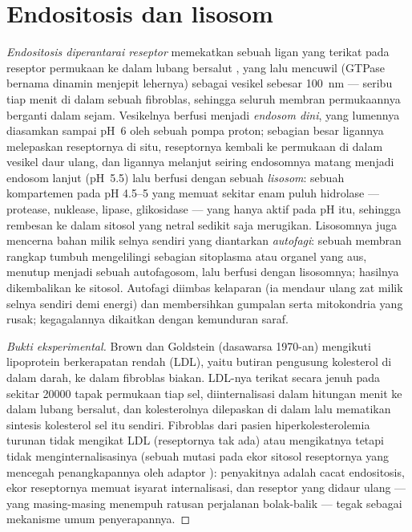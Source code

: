 \section{Endositosis dan lisosom}

\begin{definition}[Endositosis]\label{def:b3:membrane-traffic:endocytosis}
\emph{Endositosis diperantarai reseptor} memekatkan sebuah ligan yang terikat
pada reseptor permukaan ke dalam lubang bersalut , yang lalu mencuwil
(GTPase bernama dinamin menjepit lehernya) sebagai vesikel sebesar
\qty{100}{nm} --- seribu tiap menit di dalam sebuah fibroblas, sehingga
seluruh membran permukaannya berganti dalam sejam. Vesikelnya berfusi menjadi
\emph{endosom dini}, yang lumennya diasamkan sampai pH~6 oleh sebuah pompa
proton; sebagian besar ligannya melepaskan reseptornya di situ, reseptornya
kembali ke permukaan di dalam vesikel daur ulang, dan ligannya melanjut
seiring endosomnya matang menjadi endosom lanjut (pH~5.5) lalu berfusi dengan
sebuah \emph{lisosom}: sebuah kompartemen pada pH 4.5--5 yang memuat sekitar
enam puluh hidrolase --- protease, nuklease, lipase, glikosidase --- yang
hanya aktif pada pH itu, sehingga rembesan ke dalam sitosol yang netral
sedikit saja merugikan. Lisosomnya juga mencerna bahan milik selnya sendiri
yang diantarkan \emph{autofagi}: sebuah membran rangkap tumbuh mengelilingi
sebagian sitoplasma atau organel yang aus, menutup menjadi sebuah autofagosom,
lalu berfusi dengan lisosomnya; hasilnya dikembalikan ke sitosol. Autofagi
diimbas kelaparan (ia mendaur ulang zat milik selnya sendiri demi energi) dan
membersihkan gumpalan serta mitokondria yang rusak; kegagalannya dikaitkan
dengan kemunduran saraf.
\end{definition}

\begin{proof}[Bukti eksperimental]
Brown dan Goldstein (dasawarsa 1970-an) mengikuti lipoprotein berkerapatan
rendah (LDL), yaitu butiran pengusung kolesterol di dalam darah, ke dalam
fibroblas biakan. LDL-nya terikat secara jenuh pada sekitar \num{20000} tapak
permukaan tiap sel, diinternalisasi dalam hitungan menit ke dalam lubang
bersalut, dan kolesterolnya dilepaskan di dalam  lalu mematikan
sintesis kolesterol sel itu sendiri. Fibroblas dari pasien hiperkolesterolemia
turunan tidak mengikat LDL (reseptornya tak ada) atau mengikatnya tetapi
tidak menginternalisasinya (sebuah mutasi pada ekor sitosol reseptornya yang
mencegah penangkapannya oleh adaptor ): penyakitnya adalah
cacat endositosis, ekor reseptornya memuat isyarat internalisasi, dan
reseptor yang didaur ulang --- yang masing-masing menempuh ratusan
perjalanan bolak-balik --- tegak sebagai mekanisme umum penyerapannya.
\end{proof}

